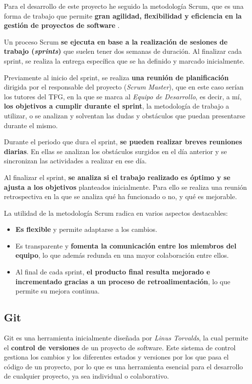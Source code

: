 Para el desarrollo de este proyecto he seguido la metodología Scrum, que es una forma de trabajo que permite \textbf{gran agilidad, flexibilidad y eficiencia en la gestión de proyectos de software} \cite{atlassian:scrum}.

Un proceso Scrum \textbf{se ejecuta en base a la realización de sesiones de trabajo (\textit{sprints})} que suelen tener dos semanas de duración. Al finalizar cada sprint, se realiza la entrega específica que se ha definido y marcado inicialmente.

Previamente al inicio del sprint, se realiza \textbf{una reunión de planificación} dirigida por el responsable del proyecto (\textit{Scrum Master}), que en este caso serían los tutores del TFG, en la que se marca al \textit{Equipo de Desarrollo}, es decir, a mí, \textbf{los objetivos a cumplir durante el sprint}, la metodología de trabajo a utilizar, o se analizan y solventan las dudas y obstáculos que puedan presentarse durante el mismo.

Durante el periodo que dura el sprint, \textbf{se pueden realizar breves reuniones diarias}. En ellas se analizan los obstáculos surgidos en el día anterior y se sincronizan las actividades a realizar en ese día.

Al finalizar el sprint, \textbf{se analiza si el trabajo realizado es óptimo y se ajusta a los objetivos} planteados inicialmente. Para ello se realiza una reunión retrospectiva en la que se analiza qué ha funcionado o no, y qué es mejorable.

La utilidad de la metodología Scrum radica en varios aspectos destacables:
\begin{itemize}
  \item \textbf{Es flexible} y permite adaptarse a los cambios.
  \item Es transparente y \textbf{fomenta la comunicación entre los miembros del equipo}, lo que además redunda en una mayor colaboración entre ellos.
  \item Al final de cada sprint, \textbf{el producto final resulta mejorado e incrementado gracias a un proceso de retroalimentación}, lo que permite su mejora continua.
\end{itemize}

\subsection{Git}

Git es una herramienta inicialmente diseñada por \textit{Linus Torvalds}, la cual permite el \textbf{control de versiones} de un proyecto de software. Este sistema de control gestiona los cambios y los diferentes estados y versiones por los que pasa el código de un proyecto, por lo que es una herramienta esencial para el desarrollo de cualquier proyecto, ya sea individual o colaborativo. \cite{atlassian:git}


